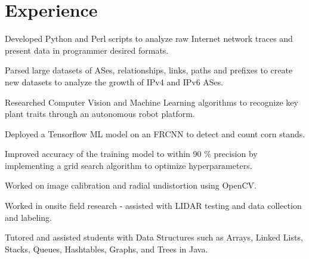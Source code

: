 \documentclass[]{deedy-resume-openfont}
\begin{document}
\begin{minipage}[t]{0.66\textwidth} 


\section{Experience}
\vspace{\topsep} %
\begin{tightemize}
\item Developed Python and Perl scripts to analyze raw Internet network traces and present data in programmer desired formats.
\item Parsed large datasets of ASes, relationships, links, paths and prefixes to create new datasets to analyze the growth of IPv4 and IPv6 ASes.
\end{tightemize}
\sectionsep

\begin{tightemize}
\item Researched Computer Vision and Machine Learning algorithms to recognize key plant traits through an autonomous robot platform.
\item Deployed a Tensorflow ML model on an FRCNN to detect and count corn stands.
\item Improved accuracy of the training model to within 90 \% precision by implementing a grid search algorithm to optimize hyperparameters.
\item Worked on image calibration and radial undistortion using OpenCV.
\item Worked in onsite field research - assisted with LIDAR testing and data collection and labeling.
\end{tightemize}
\sectionsep

\begin{tightemize}
\item Tutored and assisted students with Data Structures such as Arrays, Linked Lists, Stacks, Queues, Hashtables, Graphs, and Trees  in Java.
\end{tightemize}
\sectionsep


\end{minipage}
\end{document}
